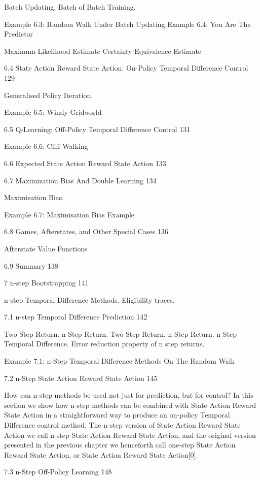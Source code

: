 Batch Updating, Batch of Batch Training.

Example 6.3: Random Walk Under Batch Updating
Example 6.4: You Are The Predictor

Maximum Likelihood Estimate
Certainty Equivalence Estimate

6.4 State Action Reward State Action: On-Policy Temporal Difference Control 129

Generalised Policy Iteration.

Example 6.5: Windy Gridworld

6.5 Q-Learning: Off-Policy Temporal Difference Control 131

Example 6.6: Cliff Walking

6.6 Expected State Action Reward State Action 133



6.7 Maximization Bias And Double Learning 134

Maximisation Bias.

Example 6.7: Maximisation Bias Example

6.8 Games, Afterstates, and Other Special Cases 136

Afterstate Value Functions

6.9 Summary 138



7 n-step Bootstrapping 141

n-step Temporal Difference Methods. Eligibility traces.

7.1 n-step Temporal Difference Prediction 142

Two Step Return. n Step Return. Two Step Return. n Step Return. n Step Temporal Difference. Error reduction property of n step returns.

Example 7.1: n-Step Temporal Difference Methods On The Random Walk

7.2 n-Step State Action Reward State Action 145

How can n-step methods be used not just for prediction, but for control? In this section we show how n-step methods can be combined with State Action Reward State Action in a straightforward way to produce an on-policy Temporal Difference control method. The n-step version of State Action Reward State Action we call n-step State Action Reward State Action, and the original version presented in the previous chapter we henceforth call one-step State Action Reward State Action, or State Action Reward State Action[0].

7.3 n-Step Off-Policy Learning 148

